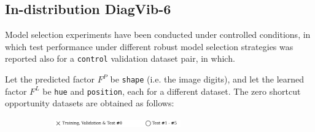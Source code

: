 \subsection{In-distribution DiagVib-6}

Model selection experiments have been conducted under controlled conditions, in which test performance
under different robust model selection strategies was reported also for a \texttt{control} validation
dataset pair, in which. \\

\begin{dataset}\label{def:zgo_experiments}
    Let the predicted factor $F^P$ be \texttt{shape} (i.e. the image digits), and let the 
    learned factor $F^L$ be \texttt{hue} and \texttt{position}, each for a different dataset. The zero 
    shortcut opportunity datasets are obtained as follows:

    \begin{figure}[H]
        \centering
        \begin{subfigure}[b]{\textwidth}
            \centering
            \includegraphics[width=0.6\textwidth]{img/datasets/_legend.pdf}
        \end{subfigure}
        \vspace{-0.2cm} %


\end{figure}
\end{dataset}
